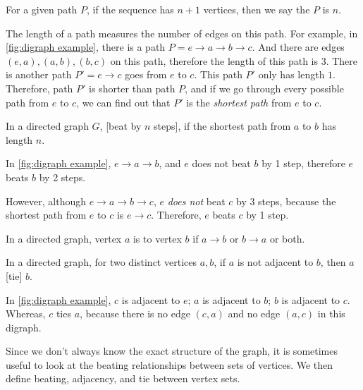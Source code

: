   \begin{definition}
    For a given path \(P\), if the sequence has \(n + 1\) vertices,
    then we say the  \(P\) is \(n\).
  \end{definition}

  The length of a path measures the number of edges on this path.
  For example, in \cref{fig:digraph example},
  there is a path \(P = e \to a \to b \to c\).
  And there are edges \((e, a), (a, b), (b, c)\) on this path,
  therefore the length of this path is 3.
  There is another path \(P' = e \to c\) goes from \(e\) to \(c\).
  This path \(P'\) only has length \(1\).
  Therefore, path \(P'\) is shorter than path \(P\),
  and if we go through every possible path from \(e\) to \(c\),
  we can find out that \(P'\) is the \emph{shortest path}
  from \(e\) to \(c\).

  \begin{definition}
    In a directed graph \(G\),
    [beat by \(n\) steps],
    if the shortest path from \(a\) to \(b\) has length \(n\).
  \end{definition}

  In \cref{fig:digraph example},
  \(e \to a \to b\),
  and \(e\) does not beat \(b\) by 1 step,
  therefore \(e\) beats \(b\) by 2 steps.

  However, although \(e \to a \to b \to c\),
  \(e\) \emph{does not} beat \(c\) by 3 steps,
  because the shortest path from \(e\) to \(c\) is \(e \to c\).
  Therefore, \(e\) beats \(c\) by 1 step.

  \begin{definition}
    In a directed graph, vertex \(a\) is  to vertex \(b\) if
    \(a \to b\) or \(b \to a\) or both.
  \end{definition}

  \begin{definition}
    In a directed graph, for two distinct vertices \(a, b\),
    if \(a\) is not adjacent to \(b\),
    then \(a\) [tie] \(b\).
  \end{definition}

  In \cref{fig:digraph example}, \(c\) is adjacent to \(e\);
  \(a\) is adjacent to \(b\); \(b\) is adjacent to \(c\).
  Whereas, \(c\) ties \(a\),
  because there is no edge \((c, a)\) and no edge \((a, c)\)
  in this digraph.

  Since we don't always know the exact structure of the graph,
  it is sometimes useful to look at
  the beating relationships between sets of vertices.
  We then define beating, adjacency, and tie between vertex sets.

